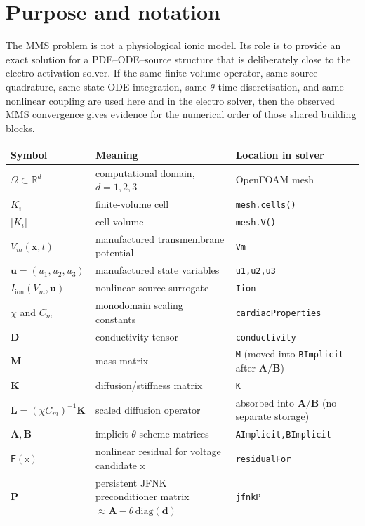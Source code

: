 \documentclass[11pt,a4paper]{article}
\newcommand{\code}[1]{\texttt{\small #1}}
\newcommand{\Vm}{V_m}
\newcommand{\Iion}{I_{\mathrm{ion}}}
\newcommand{\Dten}{\mathbf{D}}
\newcommand{\Mmass}{\mathbf{M}}
\newcommand{\Kstif}{\mathbf{K}}
\newcommand{\Lop}{\mathbf{L}}
\newcommand{\Aimp}{\mathbf{A}}
\newcommand{\Bimp}{\mathbf{B}}
\newcommand{\Fres}{\mathsf{F}}
\newcommand{\R}{\mathbb{R}}
\begin{document}
\tableofcontents
\bigskip

\section{Purpose and notation}

The MMS problem is not a physiological ionic model. Its role is to provide an
exact solution for a PDE--ODE--source structure that is deliberately close to
the electro-activation solver. If the same finite-volume operator, same source
quadrature, same state ODE integration, same $\theta$ time discretisation, and
same nonlinear coupling are used here and in the electro solver, then the
observed MMS convergence gives evidence for the numerical order of those shared
building blocks.

\begin{center}
\begin{tabular}{@{}lll@{}}
\toprule
Symbol & Meaning & Location in solver \\
\midrule
$\Omega\subset\R^d$ & computational domain, $d=1,2,3$ & OpenFOAM mesh \\
$K_i$ & finite-volume cell & \code{mesh.cells()} \\
$|K_i|$ & cell volume & \code{mesh.V()} \\
$\Vm(\mathbf{x},t)$ & manufactured transmembrane potential & \code{Vm} \\
$\mathbf{u}=(u_1,u_2,u_3)$ & manufactured state variables & \code{u1,u2,u3} \\
$\Iion(\Vm,\mathbf{u})$ & nonlinear source surrogate & \code{Iion} \\
$\chi$ and $C_m$ & monodomain scaling constants & \code{cardiacProperties} \\
$\Dten$ & conductivity tensor & \code{conductivity} \\
$\Mmass$ & mass matrix & \code{M} (moved into \code{BImplicit} after $\Aimp/\Bimp$) \\
$\Kstif$ & diffusion/stiffness matrix & \code{K} \\
$\Lop=(\chi C_m)^{-1}\Kstif$ & scaled diffusion operator & absorbed into $\Aimp/\Bimp$ (no separate storage) \\
$\Aimp,\Bimp$ & implicit $\theta$-scheme matrices & \code{AImplicit,BImplicit} \\
$\Fres(\mathsf{x})$ & nonlinear residual for voltage candidate $\mathsf{x}$ & \code{residualFor} \\
$\mathbf{P}$ & persistent JFNK preconditioner matrix $\approx\Aimp-\theta\,\mathrm{diag}(\mathbf{d})$ & \code{jfnkP} \\
\bottomrule
\end{tabular}
\end{center}
\end{document}
